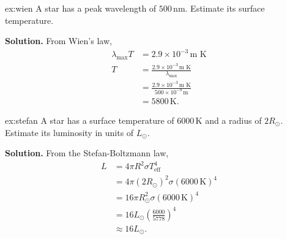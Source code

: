 \begin{example}{}{ex:wien}
A star has a peak wavelength of $500\,\text{nm}$. Estimate its surface temperature.

\smallskip\textbf{Solution.}
From Wien's law,
\begin{align*}
    \lambda_{\text{max}} T &= 2.9 \times 10^{-3}\,\text{m K} \\
    T &= \frac{2.9 \times 10^{-3}\,\text{m K}}{\lambda_{\text{max}}} \\
    &= \frac{2.9 \times 10^{-3}\,\text{m K}}{500 \times 10^{-9}\,\text{m}} \\
    &= 5800\,\text{K}.
\end{align*}
\end{example}

\begin{example}{}{ex:stefan}
A star has a surface temperature of $6000\,\text{K}$ and a radius of $2 R_\odot$. Estimate its luminosity in units of $L_\odot$.

\smallskip\textbf{Solution.}
From the Stefan-Boltzmann law,
\begin{align*}
    L &= 4\pi R^2 \sigma T_{\text{eff}}^4 \\
    &= 4\pi (2 R_\odot)^2 \sigma (6000\,\text{K})^4 \\
    &= 16\pi R_\odot^2 \sigma (6000\,\text{K})^4 \\
    &= 16 L_\odot \left(\frac{6000}{5778}\right)^4 \\
    &\approx 16 L_\odot.
\end{align*}
\end{example}






